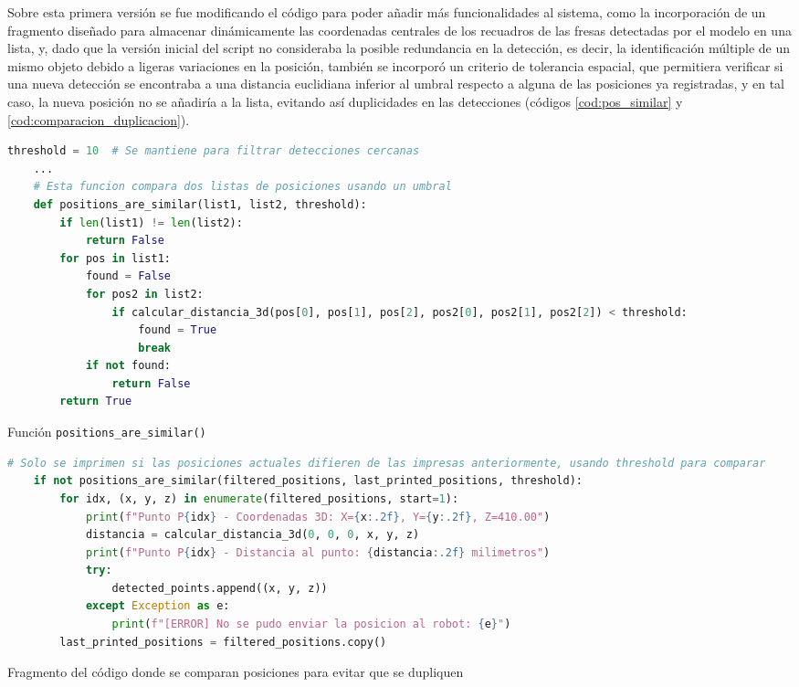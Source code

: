 Sobre esta primera versión se fue modificando el código para poder añadir más funcionalidades al sistema, como la incorporación de un fragmento diseñado para almacenar dinámicamente las coordenadas centrales de los recuadros de las fresas detectadas por el modelo en una lista, y, dado que la versión inicial del script no consideraba la posible redundancia en la detección, es decir, la identificación múltiple de un mismo objeto debido a ligeras variaciones en la posición, también se incorporó un criterio de tolerancia espacial, que permitiera verificar si una nueva detección se encontraba a una distancia euclidiana inferior al umbral respecto a alguna de las posiciones ya registradas, y en tal caso, la nueva posición no se añadiría a la lista, evitando así duplicidades en las detecciones (códigos \ref{cod:pos_similar} y \ref{cod:comparacion_duplicacion}).

\begin{code}[H]
   \begin{lstlisting}[language=Python] 
    threshold = 10  # Se mantiene para filtrar detecciones cercanas
    ...
    # Esta funcion compara dos listas de posiciones usando un umbral
    def positions_are_similar(list1, list2, threshold):
        if len(list1) != len(list2):
            return False
        for pos in list1:
            found = False
            for pos2 in list2:
                if calcular_distancia_3d(pos[0], pos[1], pos[2], pos2[0], pos2[1], pos2[2]) < threshold:
                    found = True
                    break
            if not found:
                return False
        return True
    \end{lstlisting}
    \caption{Función \texttt{positions\_are\_similar()}}
    \label{cod:pos_similar}
\end{code} 

\begin{code}[H]
   \begin{lstlisting}[language=Python] 
    # Solo se imprimen si las posiciones actuales difieren de las impresas anteriormente, usando threshold para comparar
    if not positions_are_similar(filtered_positions, last_printed_positions, threshold):
        for idx, (x, y, z) in enumerate(filtered_positions, start=1):
            print(f"Punto P{idx} - Coordenadas 3D: X={x:.2f}, Y={y:.2f}, Z=410.00")
            distancia = calcular_distancia_3d(0, 0, 0, x, y, z)
            print(f"Punto P{idx} - Distancia al punto: {distancia:.2f} milimetros")
            try:
                detected_points.append((x, y, z))
            except Exception as e:
                print(f"[ERROR] No se pudo enviar la posicion al robot: {e}")
        last_printed_positions = filtered_positions.copy()
    \end{lstlisting}
    \caption{Fragmento del código donde se comparan posiciones para evitar que se dupliquen}
    \label{cod:comparacion_duplicacion}
\end{code} 

